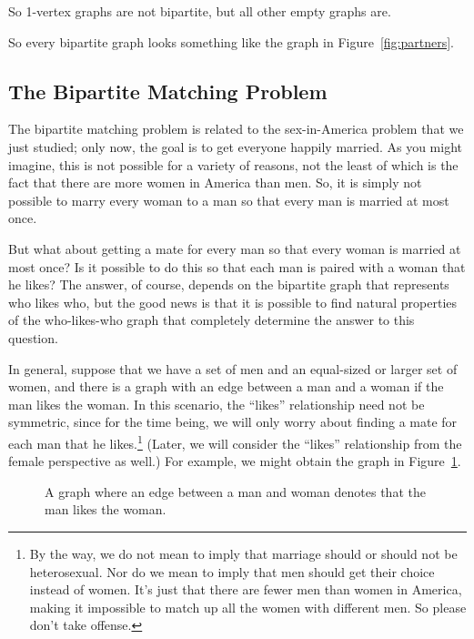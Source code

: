 \begin{editingnotes}
So 1-vertex graphs are not bipartite, but all other empty graphs are.
\end{editingnotes}

So every bipartite graph looks something like the graph in
Figure~\ref{fig:partners}.

\subsection{The Bipartite Matching Problem}

The bipartite matching problem is related to the sex-in-America
problem that we just studied; only now, the goal is to get everyone
happily married.  As you might imagine, this is not possible for a
variety of reasons, not the least of which is the fact that there are
more women in America than men.  So, it is simply not possible to
marry every woman to a man so that every man is married at most once.

But what about getting a mate for every man so that every woman is married
at most once?  Is it possible to do this so that each man is paired with a
woman that he likes?  The answer, of course, depends on the bipartite graph
that represents who likes who, but the good news is that it is possible to
find natural properties of the who-likes-who graph that completely
determine the answer to this question.

In general, suppose that we have a set of men and an equal-sized or
larger set of women, and there is a graph with an edge between a man
and a woman if the man likes the woman.  In this scenario, the
``likes'' relationship need not be symmetric, since for the time
being, we will only worry about finding a mate for each man that he
likes.\footnote{By the way, we do not mean to imply that marriage
  should or should not be heterosexual.  Nor do we mean to imply that
  men should get their choice instead of women.  It's just that there
  are fewer men than women in America, making it impossible to match
  up all the women with different men.  So please don't take offense.}
(Later, we will consider the ``likes'' relationship from the female
perspective as well.)  For example, we might obtain the graph in
Figure~\ref{fig:5J}.

\begin{figure}



\caption{A graph where an edge between a man and woman denotes that
  the man likes the woman.}

\label{fig:5J}

\end{figure}

